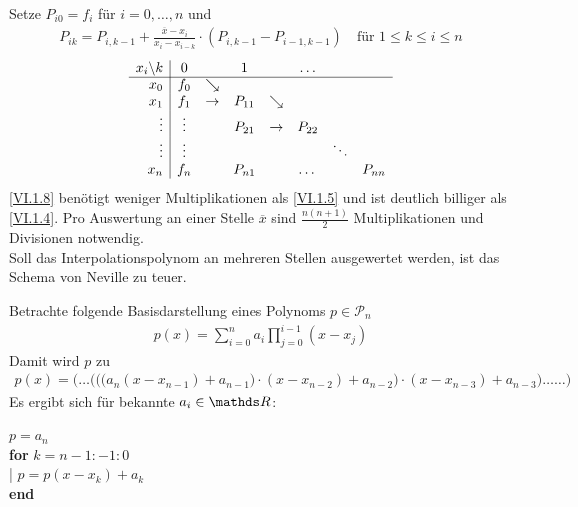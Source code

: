 Setze $P_{i0} = f_i$ für $i=0, \dots , n$ und
\begin{gather}
  P_{ik} = P_{i,k-1}+\frac{\overline{x}-x_i}{x_i-x_{i-k}}
  \cdot \left( P_{i,k-1}-P_{i-1,k-1}\right)
  \quad \text{für } 1\leq k\leq i\leq n
  \label{VI.1.8}
\end{gather}
\begin{gather*}
  \begin{array}{r|cccccccccc}
    x_i\backslash k & 0 && 1 && \dots \\
    \cline{1-8}
    x_0 & f_0 & \searrow\\
    x_1 & f_1 & \rightarrow & P_{11}&\searrow\\
    \vdots & \vdots && P_{21} &\rightarrow& P_{22} \\
    \vdots  & \vdots && && &\ddots \\
    x_n & f_n && P_{n1} && \dots &&  P_{nn}
  \end{array}
\end{gather*}
\eqref{VI.1.8} benötigt weniger Multiplikationen als 
\eqref{VI.1.5} und ist deutlich billiger als
\eqref{VI.1.4}.
Pro Auswertung an einer Stelle $\overline{x}$ sind
$\frac{n(n+1)}{2}$ Multiplikationen und Divisionen notwendig.\\
Soll das Interpolationspolynom an mehreren Stellen ausgewertet werden,
ist das Schema von Neville zu teuer.

Betrachte folgende Basisdarstellung eines Polynoms $p\in\mathcal{P}_n$
\begin{align}
  p(x) = \sum_{i=0}^{n}a_i \prod_{j=0}^{i-1} (x-x_j)
  \label{VI.1.9}
\end{align} 
Damit wird $p$ zu 
\begin{gather}
  p(x)= \Bigg(\dots \bigg(\Big(
  \big(a_n(x-x_{n-1})+a_{n-1}\big)\cdot(x-x_{n-2})+a_{n-2}\Big)
  \cdot (x-x_{n-3})+a_{n-3}\bigg) \dots\dots\Bigg)
  \label{VI.1.10}
\end{gather}
Es ergibt sich für bekannte $a_i\in\R$:

\begin{pseudocode}{6cm}
  $p=a_n$ \\
  \textbf{for} $k=n-1:-1:0$\\
  |\>  $p=p(x-x_k)+a_k$\\
  \textbf{end}
\end{pseudocode}

